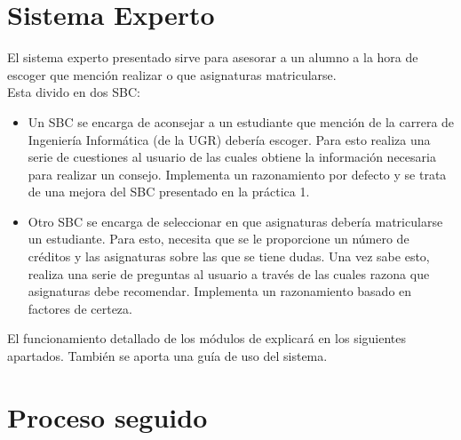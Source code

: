 \chapter{Sistema Experto}
El sistema experto presentado sirve para asesorar a un alumno a la hora de escoger que mención realizar o que asignaturas matricularse.\\
Esta divido en dos SBC:
\begin{itemize}
   \item Un SBC se encarga de aconsejar a un estudiante que mención de la carrera de Ingeniería Informática (de la UGR) debería escoger. Para esto realiza una serie de cuestiones al usuario de las cuales obtiene la información necesaria para realizar un consejo. Implementa un razonamiento por defecto y se trata de una mejora del SBC presentado en la práctica 1.
   \item Otro SBC se encarga de seleccionar en que asignaturas debería matricularse un estudiante. Para esto, necesita que se le proporcione un número de créditos y las asignaturas sobre las que se tiene dudas. Una vez sabe esto, realiza una serie de preguntas al usuario a través de las cuales razona que asignaturas debe recomendar. Implementa un razonamiento basado en factores de certeza.
\end{itemize}

El funcionamiento detallado de los módulos de explicará en los siguientes apartados. También se aporta una guía de uso del sistema.

\chapter{Proceso seguido}
